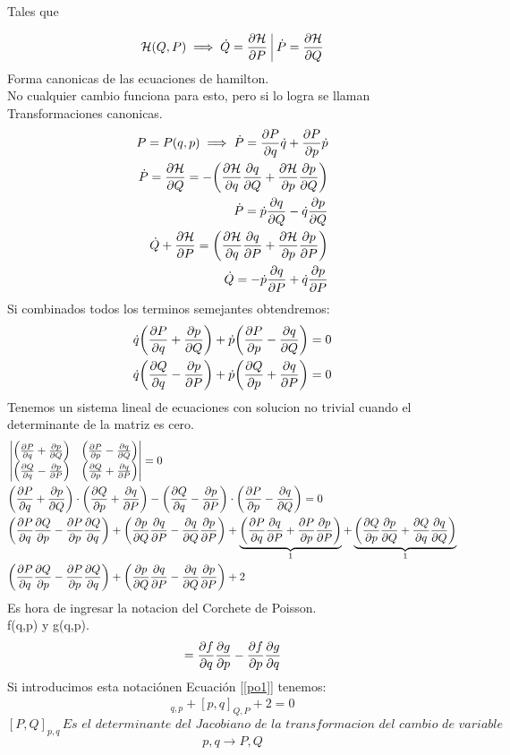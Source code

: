 \documentclass[12pt]{article}
\newcommand{\eqreff}[1]{Ecuación [\ref{#1}]}
\begin{document}
Tales que 

$$\mathcal{H}(Q,P) \implies \dot{Q}=\pdv{\mathcal{H}}{P}\,\,\vline \,\, \dot{P}= \pdv{\mathcal{H}}{Q} $$ 
Forma canonicas de las ecuaciones de hamilton.\\
No cualquier cambio funciona para esto, pero si lo logra se llaman Transformaciones canonicas.\\
\begin{align}
P= P(q,p) \implies \dot{P} = \pdv{P}{q} \dot{q}+ \pdv{P}{p}\dot{p}\\
\dot{P}= \pdv{\mathcal{H}}{Q}	= - \qty(\pdv{\mathcal{H}}{q} \pdv{q}{Q}+ \pdv{\mathcal{H}}{p}\pdv{p}{Q})\\
\dot{P}= \dot{p}\pdv{q}{Q} - \dot{q} \pdv{p}{Q}\\
\dot{Q}+ \pdv{\mathcal{H}}{P}= \qty(\pdv{\mathcal{H}}{q} \pdv{q}{P}+ \pdv{\mathcal{H}}{p}\pdv{p}{P})\\
\dot{Q}= - \dot{p}\pdv{q}{P}+ \dot{q}\pdv{p}{P}
\end{align}
Si combinados todos los terminos semejantes obtendremos:\\
\begin{align}
\dot{q} \qty(\pdv{P}{q}+ \pdv{p}{Q})+\dot{p}\qty(\pdv{P}{p}- \pdv{q}{Q})=0\\
\dot{q} \qty(\pdv{Q}{q}- \pdv{p}{P})+\dot{p}\qty(\pdv{Q}{p}+ \pdv{q}{P})=0
\end{align}
Tenemos un sistema lineal de ecuaciones con solucion no trivial cuando el determinante de la matriz es cero.
\begin{align}
&\begin{vmatrix}
\qty(\pdv{P}{q}+ \pdv{p}{Q})&	\qty(\pdv{P}{p}- \pdv{q}{Q})\\
\qty(\pdv{Q}{q}- \pdv{p}{P})& \qty(\pdv{Q}{p}+ \pdv{q}{P})
\end{vmatrix}=0\\
&\qty(\pdv{P}{q}+ \pdv{p}{Q})\cdot \qty(\pdv{Q}{p}+ \pdv{q}{P})- \qty(\pdv{Q}{q}- \pdv{p}{P})\cdot \qty(\pdv{P}{p}- \pdv{q}{Q})= 0\\
&\qty(\pdv{P}{q} \pdv{Q}{p}-\pdv{P}{p} \pdv{Q}{q})+ \qty(\pdv{p}{Q} \pdv{q}{P}-\pdv{q}{Q} \pdv{p}{P})+\underbrace{\qty(\pdv{P}{q} \pdv{q}{P}+ \pdv{P}{p} \pdv{p}{P})}_{1} +\underbrace{\qty(\pdv{Q}{p} \pdv{p}{Q}+ \pdv{Q}{q} \pdv{q}{Q})}_{1}\\
& \qty(\pdv{P}{q} \pdv{Q}{p}-\pdv{P}{p} \pdv{Q}{q})+ \qty(\pdv{p}{Q} \pdv{q}{P}-\pdv{q}{Q} \pdv{p}{P})+2 \label{po1}
\end{align}
Es hora de ingresar la notacion del Corchete de Poisson.\\
f(q,p) y g(q,p).
\begin{align}
[f,g]= \pdv{f}{q} \pdv{g}{p}-\pdv{f}{p} \pdv{g}{q}
\end{align}
Si introducimos esta notaciónen \eqreff{po1} tenemos:
\begin{align}
[P,Q]_{q,p}+[p,q]_{Q,P}+2=0	\label{po2}
\end{align}
$$[P,Q]_{p,q}\, \textit{Es el determinante del Jacobiano de la transformacion del cambio de variable }$$
$$p,q \rightarrow P,Q $$
\end{document}
